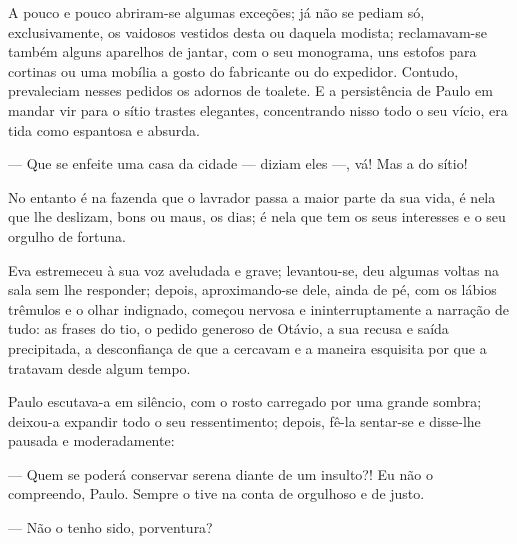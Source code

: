 {A pouco e pouco abriram-se algumas exceções; já não se pediam
só, exclusivamente, os vaidosos vestidos desta ou daquela modista;
reclamavam-se também alguns aparelhos de jantar, com o seu
monograma, uns estofos para cortinas ou uma mobília a gosto do
fabricante ou do expedidor. Contudo, prevaleciam
nesses pedidos os adornos de toalete. E a persistência
de Paulo em mandar vir para o sítio trastes elegantes, concentrando
nisso todo o seu vício, era tida como espantosa e absurda.

--- Que se enfeite uma casa da cidade --- diziam eles
---, vá! Mas a do sítio!

No entanto é na fazenda que o lavrador passa a maior
parte da sua vida, é nela que lhe deslizam, bons ou maus, os dias; é
nela que tem os seus interesses e o seu orgulho de fortuna.



Eva estremeceu à sua voz aveludada e grave; levantou-se, deu
algumas voltas na sala sem lhe responder; depois, aproximando-se dele,
ainda de pé, com os lábios trêmulos e o olhar indignado,
começou nervosa e ininterruptamente a narração de tudo: as frases do
tio, o pedido generoso de Otávio, a sua recusa e saída
precipitada, a desconfiança de que a cercavam e a maneira
esquisita por que a tratavam desde algum tempo.

Paulo escutava-a em silêncio, com o rosto carregado por uma
grande sombra; deixou-a expandir todo o seu ressentimento; depois,
fê-la sentar-se e disse-lhe pausada e moderadamente:


--- Quem se poderá conservar serena diante de um
insulto?! Eu não o compreendo, Paulo. Sempre o tive na conta de
orgulhoso e de justo.

--- Não o tenho sido, porventura?

}
